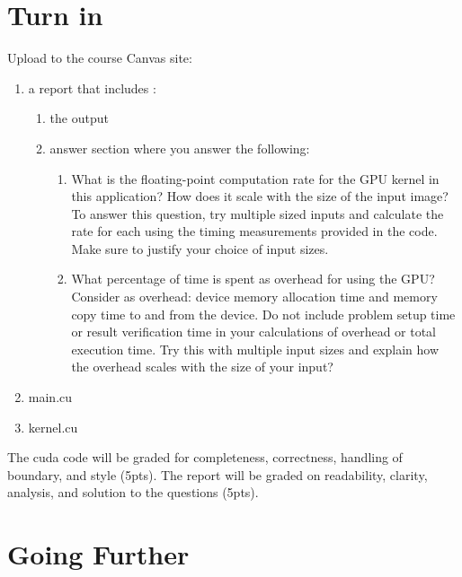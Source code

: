 \documentclass{article}
\begin{document}
\section{Turn in}
Upload to the course Canvas site:
\begin{enumerate}
\item a report that includes :
	\begin{enumerate}
	\item the output
	\item answer section where you answer the following:
		\begin{enumerate}
		\item What is the floating-point computation rate for the GPU kernel in this application? How does it scale with the size of the input image? To answer this question, try multiple sized inputs and calculate the rate for each using the timing measurements provided in the code. Make sure to justify your choice of input sizes.
		\item	What percentage of time is spent as overhead for using the GPU? Consider as overhead: device memory allocation time and memory copy time to and from the device. Do not include problem setup time or result verification time in your calculations of overhead or total execution time. Try this with multiple input sizes and explain how the overhead scales with the size of your input?

		\end{enumerate}
	\end{enumerate}
\item main.cu
\item kernel.cu
\end{enumerate}
The cuda code will be graded for completeness, correctness, handling of boundary, and style (5pts).  The report will be graded on readability, clarity, analysis, and solution to the questions (5pts).


\section{Going Further}
\end{document}

